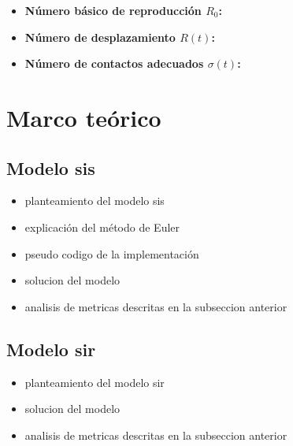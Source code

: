 \documentclass{article}
\begin{document}
\begin{itemize}
    \item \textbf{Número básico de reproducción $R_0$:} 
    \item \textbf{Número de desplazamiento $R(t)$:}
    \item \textbf{Número de contactos adecuados $\sigma(t)$:}
\end{itemize}

\section{Marco teórico}

\subsection{Modelo sis}
\begin{itemize}
    \item planteamiento del modelo sis 
    \item explicación del método de Euler 
    \item pseudo codigo de la implementación
    \item solucion del modelo 
    \item analisis de metricas descritas en la subseccion anterior
\end{itemize}
\subsection{Modelo sir}
\begin{itemize}
    \item planteamiento del modelo sir
    \item solucion del modelo 
    \item analisis de metricas descritas en la subseccion anterior
\end{itemize}



\end{document}
